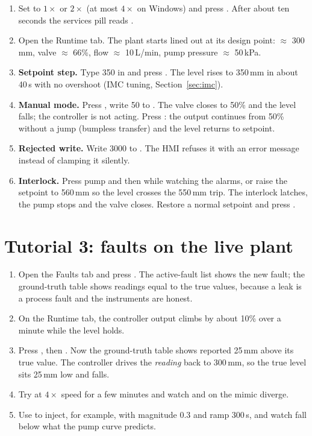 \begin{enumerate}
  \item Set  to $1\times$ or $2\times$ (at most $4\times$ on
        Windows) and press . After about ten seconds the
        services pill reads .
  \item Open the Runtime tab. The plant starts lined out at its design point:
         $\approx$ 300\,mm, valve $\approx$ 66\%, flow
        $\approx$ 10\,L/min, pump pressure $\approx$ 50\,kPa.
  \item \textbf{Setpoint step.} Type 350 in  and press
        . The level rises to 350\,mm in about 40\,s with no
        overshoot (IMC tuning, Section~\ref{sec:imc}).
  \item \textbf{Manual mode.} Press , write 50 to .
        The valve closes to 50\% and the level falls; the controller is not
        acting. Press : the output continues from 50\% without a jump
        (bumpless transfer) and the level returns to setpoint.
  \item \textbf{Rejected write.} Write 3000 to . The HMI refuses
        it with an error message instead of clamping it silently.
  \item \textbf{Interlock.} Press pump  and then  while
        watching the alarms, or raise the setpoint to 560\,mm so the level
        crosses the 550\,mm trip. The interlock latches, the pump stops and
        the valve closes. Restore a normal setpoint and press
        .
\end{enumerate}

\section{Tutorial 3: faults on the live plant}

\begin{enumerate}
  \item Open the Faults tab and press . The active-fault
        list shows the new fault; the ground-truth table shows readings equal
        to the true values, because a leak is a process fault and the
        instruments are honest.
  \item On the Runtime tab, the controller output climbs by about 10\% over a
        minute while the level holds.
  \item Press , then . Now the
        ground-truth table shows  reported 25\,mm above its true
        value. The controller drives the \emph{reading} back to 300\,mm, so
        the true level sits 25\,mm low and  falls.
  \item Try  at $4\times$ speed for a few minutes and
        watch  and  on the mimic diverge.
  \item Use  to inject, for example,  with
        magnitude 0.3 and ramp 300\,s, and watch  fall below what
        the pump curve predicts.
\end{enumerate}


